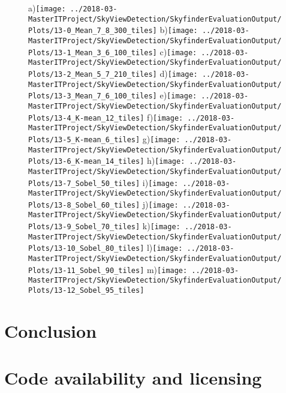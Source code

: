 \documentclass[final,3p,times,authoryear]{elsarticle}
\begin{document}
\begin{figure}
\centering
a)\texttt{[image: ../2018-03-MasterITProject/SkyViewDetection/SkyfinderEvaluationOutput/Plots/13-0\_Mean\_7\_8\_300\_tiles]}
b)\texttt{[image: ../2018-03-MasterITProject/SkyViewDetection/SkyfinderEvaluationOutput/Plots/13-1\_Mean\_3\_6\_100\_tiles]}
c)\texttt{[image: ../2018-03-MasterITProject/SkyViewDetection/SkyfinderEvaluationOutput/Plots/13-2\_Mean\_5\_7\_210\_tiles]}
d)\texttt{[image: ../2018-03-MasterITProject/SkyViewDetection/SkyfinderEvaluationOutput/Plots/13-3\_Mean\_7\_6\_100\_tiles]}
e)\texttt{[image: ../2018-03-MasterITProject/SkyViewDetection/SkyfinderEvaluationOutput/Plots/13-4\_K-mean\_12\_tiles]}
f)\texttt{[image: ../2018-03-MasterITProject/SkyViewDetection/SkyfinderEvaluationOutput/Plots/13-5\_K-mean\_6\_tiles]}
g)\texttt{[image: ../2018-03-MasterITProject/SkyViewDetection/SkyfinderEvaluationOutput/Plots/13-6\_K-mean\_14\_tiles]}
h)\texttt{[image: ../2018-03-MasterITProject/SkyViewDetection/SkyfinderEvaluationOutput/Plots/13-7\_Sobel\_50\_tiles]}
i)\texttt{[image: ../2018-03-MasterITProject/SkyViewDetection/SkyfinderEvaluationOutput/Plots/13-8\_Sobel\_60\_tiles]}
j)\texttt{[image: ../2018-03-MasterITProject/SkyViewDetection/SkyfinderEvaluationOutput/Plots/13-9\_Sobel\_70\_tiles]}
k)\texttt{[image: ../2018-03-MasterITProject/SkyViewDetection/SkyfinderEvaluationOutput/Plots/13-10\_Sobel\_80\_tiles]}
l)\texttt{[image: ../2018-03-MasterITProject/SkyViewDetection/SkyfinderEvaluationOutput/Plots/13-11\_Sobel\_90\_tiles]}
m)\texttt{[image: ../2018-03-MasterITProject/SkyViewDetection/SkyfinderEvaluationOutput/Plots/13-12\_Sobel\_95\_tiles]}

\caption{}
\label{fig:13-9_Sobel_70_tiles}
\end{figure}










\section{Conclusion}\label{sec:conclusion}


\section{Code availability and licensing}\label{sec:available}
\end{document}
